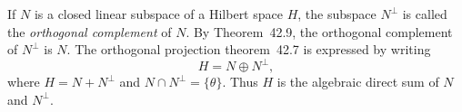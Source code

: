 If $N$ is a closed linear subspace of a Hilbert space $H$, the subspace $N^\perp$ is called the \emph{orthogonal complement} of $N$. By Theorem~42.9, the orthogonal complement of $N^\perp$ is $N$. The orthogonal projection theorem~42.7 is expressed by writing
$$H = N \oplus N^\perp,$$
where $H = N + N^\perp$ and $N \cap N^\perp = \{\theta\}$. Thus $H$ is the algebraic direct sum of $N$ and $N^\perp$.
